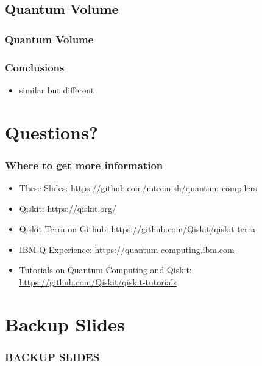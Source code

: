 \documentclass[aspectratio=169,11pt,hyperref={colorlinks=true}]{beamer}
\begin{document}
\subsection{Quantum Volume}
\begin{frame}
    \frametitle{Quantum Volume\footnotemark[1]}

    \vspace{3em}
\end{frame}
\begin{frame}
    \frametitle{Conclusions}
    \begin{itemize}
        \item similar but different
    \end{itemize}
\end{frame}

\section{Questions?}
\begin{frame}
\frametitle{Where to get more information}
    \begin{itemize}
        \item These Slides: \href{https://github.com/mtreinish/quantum-compilers}{https://github.com/mtreinish/quantum-compilers}
        \item Qiskit: \href{https://qiskit.org/}{https://qiskit.org/}
        \item Qiskit Terra on Github: \href{https://github.com/Qiskit/qiskit-terra}{https://github.com/Qiskit/qiskit-terra}
        \item IBM Q Experience: \href{https://quantum-computing.ibm.com}{https://quantum-computing.ibm.com}
        \item Tutorials on Quantum Computing and Qiskit: \href{https://github.com/Qiskit/qiskit-tutorials}{https://github.com/Qiskit/qiskit-tutorials}
    \end{itemize}
\end{frame}

\section{Backup Slides}
\begin{frame}[noframenumbering]
    \frametitle{BACKUP SLIDES}
\end{frame}
\end{document}
